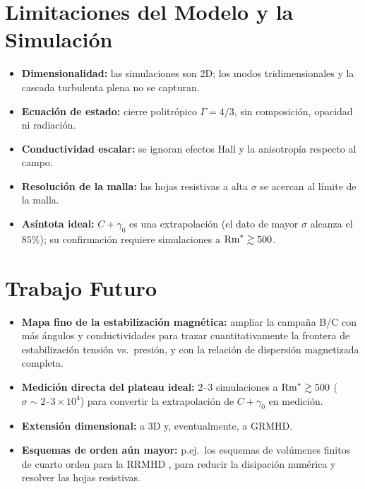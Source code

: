 \section{Limitaciones del Modelo y la Simulación}
\begin{itemize}
\item \textbf{Dimensionalidad:} las simulaciones son 2D; los modos tridimensionales y la cascada turbulenta plena no se capturan.
\item \textbf{Ecuación de estado:} cierre politrópico $\Gamma=4/3$, sin composición, opacidad ni radiación.
\item \textbf{Conductividad escalar:} se ignoran efectos Hall y la anisotropía respecto al campo.
\item \textbf{Resolución de la malla:} las hojas resistivas a alta $\sigma$ se acercan al límite de la malla.
\item \textbf{Asíntota ideal:} $C+\gamma_0$ es una extrapolación (el dato de mayor $\sigma$ alcanza el $85\%$); su confirmación requiere simulaciones a $\mathrm{Rm}^{*}\gtrsim500$.
\end{itemize}

\section{Trabajo Futuro}
\begin{itemize}
\item \textbf{Mapa fino de la estabilización magnética:} ampliar la campaña B/C con más ángulos y conductividades para trazar cuantitativamente la frontera de estabilización tensión vs.\ presión, y con la relación de dispersión magnetizada completa.
\item \textbf{Medición directa del plateau ideal:} $2$--$3$ simulaciones a $\mathrm{Rm}^{*}\gtrsim500$ ($\sigma\sim2$--$3\times10^4$) para convertir la extrapolación de $C+\gamma_0$ en medición.
\item \textbf{Extensión dimensional:} a 3D y, eventualmente, a GRMHD.
\item \textbf{Esquemas de orden aún mayor:} p.ej.\ los esquemas de volúmenes finitos de cuarto orden para la RRMHD \parencite{mignone2024}, para reducir la disipación numérica y resolver las hojas resistivas.
\end{itemize}
